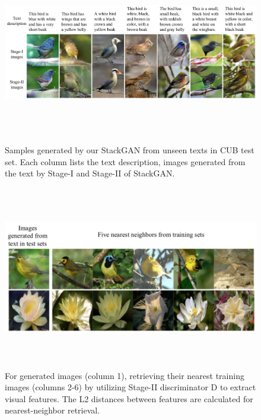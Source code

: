 \documentclass[a4paper,12pt,oneside]{article}
\begin{document}
\begin{figure}[H]
\centering
\includegraphics[height=8cm,width=15cm]{Figure5.png}
\caption[Samples generated by our StackGAN from unseen texts in CUB test set]{Samples generated by our StackGAN from unseen texts in CUB test set. Each column lists the text description, images generated from the text by Stage-I and Stage-II of StackGAN.}
\end{figure}

\begin{figure}[H]
\centering
\includegraphics[height=8cm,width=15cm]{Figure6.png}
\caption[Utilizing Stage-II discriminator D to extract visual features]{For generated images (column 1), retrieving their nearest training images (columns 2-6) by utilizing Stage-II discriminator D to extract visual features. The L2 distances between features are calculated for nearest-neighbor retrieval.}
\end{figure}
\end{document}
